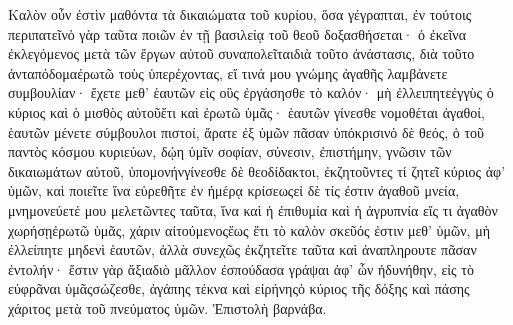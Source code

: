 Καλὸν οὖν ἐστὶν μαθόντα τὰ δικαιώματα τοῦ κυρίου, ὅσα γέγραπται, ἐν τούτοις περιπατεῖνὁ γὰρ ταῦτα ποιῶν ἐν τῇ βασιλείᾳ τοῦ θεοῦ δοξασθήσεται· ὁ ἐκεῖνα ἐκλεγόμενος μετὰ τῶν ἔργων αὐτοῦ συναπολεῖταιδιὰ τοῦτο ἀνάστασις, διὰ τοῦτο ἀνταπόδομαἐρωτῶ τοὺς ὑπερέχοντας, εἴ τινά μου γνώμης ἀγαθῆς λαμβάνετε συμβουλίαν· ἔχετε μεθ’ ἑαυτῶν εἰς οὓς ἐργάσησθε τὸ καλόν· μὴ ἐλλειπητεἐγγὺς ὁ κύριος καὶ ὁ μισθὸς αὐτοῦἔτι καὶ ἐρωτῶ ὑμᾶς· ἑαυτῶν γίνεσθε νομοθέται ἀγαθοί, ἑαυτῶν μένετε σύμβουλοι πιστοί, ἄρατε ἐξ ὑμῶν πᾶσαν ὑπόκρισινὁ δὲ θεός, ὁ τοῦ παντὸς κόσμου κυριεύων, δῴη ὑμῖν σοφίαν, σύνεσιν, ἐπιστήμην, γνῶσιν τῶν δικαιωμάτων αὐτοῦ, ὑπομονήνγίνεσθε δὲ θεοδίδακτοι, ἐκζητοῦντες τί ζητεῖ κύριος ἀφ’ ὑμῶν, καὶ ποιεῖτε ἵνα εὑρεθῆτε ἐν ἡμέρᾳ κρίσεωςεἰ δὲ τίς ἐστιν ἀγαθοῦ μνεία, μνημονεύετέ μου μελετῶντες ταῦτα, ἵνα καὶ ἡ ἐπιθυμία καὶ ἡ ἀγρυπνία εἴς τι ἀγαθὸν χωρήσῃἐρωτῶ ὑμᾶς, χάριν αἰτούμενοςἕως ἔτι τὸ καλὸν σκεῦός ἐστιν μεθ’ ὑμῶν, μὴ ἐλλείπητε μηδενὶ ἑαυτῶν, ἀλλὰ συνεχῶς ἐκζητεῖτε ταῦτα καὶ ἀναπληρουτε πᾶσαν ἐντολήν· ἔστιν γὰρ ἄξιαδιὸ μᾶλλον ἐσπούδασα γράψαι ἀφ’ ὧν ἠδυνήθην, εἰς τὸ εὐφρᾶναι ὑμᾶςσώζεσθε, ἀγάπης τέκνα καὶ εἰρήνηςὁ κύριος τῆς δόξης καὶ πάσης χάριτος μετὰ τοῦ πνεύματος ὑμῶν.
Ἐπιστολὴ βαρνάβα.
